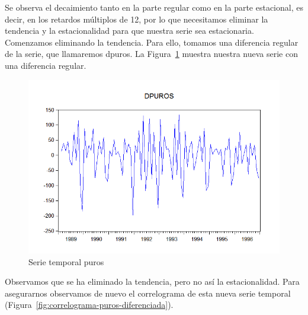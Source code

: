 \documentclass[12pt,a4paper,twoside,openright,titlepage,final]{article}
\begin{document}
Se observa el decaimiento tanto en la parte regular como en la parte estacional, es decir, en los retardos múltiplos de 12, por lo que necesitamos eliminar la tendencia y la estacionalidad para que nuestra serie sea estacionaria.\\

Comenzamos eliminando la tendencia. Para ello, tomamos una diferencia regular de la serie, que llamaremos dpuros. La Figura~\ref{fig:puros-diferenciada} muestra nuestra nueva serie con una diferencia regular.\\

\begin{figure}[tbph!]
	\centering
	\includegraphics[width=0.8\linewidth]{imagenes/puros/puros-diferenciada.png}
	\caption{Serie temporal puros}
	\label{fig:puros-diferenciada}
\end{figure}

Observamos que se ha eliminado la tendencia, pero no así la estacionalidad. Para asegurarnos observamos de nuevo el correlograma de esta nueva serie temporal (Figura~\ref{fig:correlograma-puros-diferenciada}).\\
\end{document}
